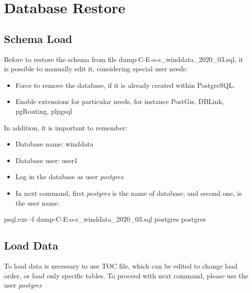 \documentclass[12pt,twoside]{reedthesis}
\newenvironment{Shaded}{\begin{snugshade}}{\end{snugshade}}
\newcommand{\ExtensionTok}[1]{#1}
\newcommand{\NormalTok}[1]{#1}
\providecommand{\tightlist}{%
  \setlength{\itemsep}{0pt}\setlength{\parskip}{0pt}}
\begin{document}
\hypertarget{database-restore}{%
\section{Database Restore}\label{database-restore}}

\hypertarget{schema-load}{%
\subsection{Schema Load}\label{schema-load}}

Before to restore the schema from file dump-C-E-o-s\_winddata\_2020\_03.sql, it is possible to manually edit it, considering special user needs:
\begin{itemize}
\tightlist
\item
  Force to remove the database, if it is already created within PostgreSQL.
\item
  Enable extensions for particular needs, for instance PostGis, DBLink, pgRouting, plpgsql
\end{itemize}
In addition, it is important to remember:
\begin{itemize}
\tightlist
\item
  Database name: winddata
\item
  Database user: user1
\item
  Log in the database as user \emph{postgres}
\item
  In next command, first \emph{postgres} is the name of database, and second one, is the user name.
\end{itemize}
\scriptsize

\vspace{0.4cm}
\begin{Shaded}
\begin{Highlighting}[]
      \ExtensionTok{psql.exe}\NormalTok{ -f dump-C-E-o-s_winddata_2020_03.sql postgres postgres}
\end{Highlighting}
\end{Shaded}
\normalsize

\hypertarget{load-data}{%
\subsection{Load Data}\label{load-data}}

To load data is necessary to use TOC file, which can be edited to change load order, or load only specific tables. To proceed with next command, please use the user \emph{postgres}
\end{document}
